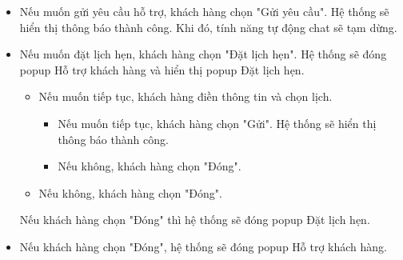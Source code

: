 \begin{itemize}
    \item Nếu muốn gửi yêu cầu hỗ trợ, khách hàng chọn "Gửi yêu cầu". Hệ thống sẽ hiển thị thông báo thành công. Khi đó, tính năng tự động chat sẽ tạm dừng.
    \item Nếu muốn đặt lịch hẹn, khách hàng chọn "Đặt lịch hẹn". Hệ thống sẽ đóng popup Hỗ trợ khách hàng và hiển thị popup Đặt lịch hẹn. 
    \begin{itemize}
        \item Nếu muốn tiếp tục, khách hàng điền thông tin và chọn lịch.
        \begin{itemize}
            \item Nếu muốn tiếp tục, khách hàng chọn "Gửi". Hệ thống sẽ hiển thị thông báo thành công.
            \item Nếu không, khách hàng chọn "Đóng".
        \end{itemize}
        \item Nếu không, khách hàng chọn "Đóng".
    \end{itemize}
    Nếu khách hàng chọn "Đóng" thì hệ thống sẽ đóng popup Đặt lịch hẹn.
    \item Nếu khách hàng chọn "Đóng", hệ thống sẽ đóng popup Hỗ trợ khách hàng.
\end{itemize}
